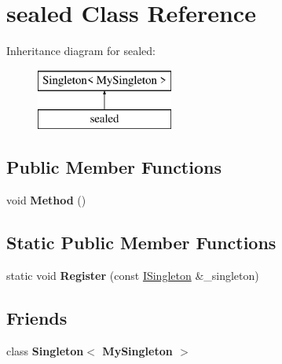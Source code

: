 \hypertarget{classsealed}{}\section{sealed Class Reference}
\label{classsealed}
Inheritance diagram for sealed\+:\begin{figure}[H]
\begin{center}
\leavevmode
\includegraphics[height=2.000000cm]{classsealed}
\end{center}
\end{figure}
\subsection*{Public Member Functions}
\begin{DoxyCompactItemize}
\item 
void {\bfseries Method} ()\hypertarget{classsealed_a650aa1f57c9fb820bb9f3ca702e0f149}{}\label{classsealed_a650aa1f57c9fb820bb9f3ca702e0f149}

\end{DoxyCompactItemize}
\subsection*{Static Public Member Functions}
\begin{DoxyCompactItemize}
\item 
static void {\bfseries Register} (const \hyperlink{class_i_singleton}{I\+Singleton} \&\+\_\+singleton)\hypertarget{classsealed_a67f2e982149c70b1ad52b6bc28fc14ed}{}\label{classsealed_a67f2e982149c70b1ad52b6bc28fc14ed}

\end{DoxyCompactItemize}
\subsection*{Friends}
\begin{DoxyCompactItemize}
\item 
class {\bfseries Singleton$<$ My\+Singleton $>$}\hypertarget{classsealed_aaff7a312f915bf84cd0177faab598ace}{}\label{classsealed_aaff7a312f915bf84cd0177faab598ace}

\end{DoxyCompactItemize}


